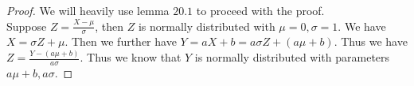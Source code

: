 \documentclass[11pt]{article}
\begin{document}
\newpage
{}

\begin{Answer}
    \begin{proof}
        We will heavily use lemma $20.1$ to proceed with the proof. \\
        Suppose $Z = \frac{X - \mu}{\sigma}$, then $Z$ is normally distributed with $\mu=0, \sigma=1$. 
        We have $X = \sigma Z + \mu$. Then we further have $Y = aX + b = a\sigma Z + (a\mu + b)$. Thus 
        we have $Z = \frac{Y - (a\mu + b)}{a\sigma}$. Thus we know that $Y$ is normally distributed 
        with parameters $a\mu + b, a\sigma$. 
    \end{proof}
\end{Answer}

\newpage
{}
\end{document}
